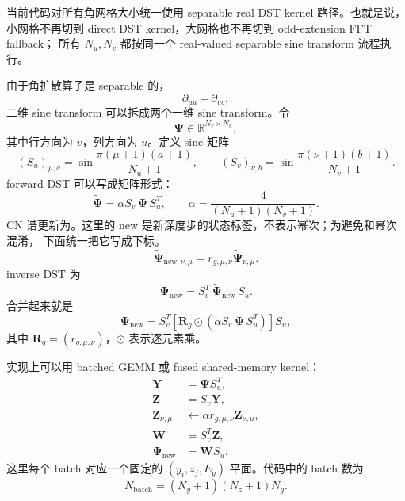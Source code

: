 \documentclass[11pt,a4paper]{ctexart}
\begin{document}
当前代码对所有角网格大小统一使用 separable real DST kernel 路径。也就是说，
小网格不再切到 direct DST kernel，大网格也不再切到 odd-extension FFT fallback；
所有 \(N_u,N_v\) 都按同一个 real-valued separable sine transform 流程执行。

由于角扩散算子是 separable 的，
\begin{equation}
  \partial_{uu}+\partial_{vv},
\end{equation}
二维 sine transform 可以拆成两个一维 sine transform。令
\begin{equation}
  \mathbf \Psi\in\mathbb R^{N_v\times N_u},
\end{equation}
其中行方向为 \(v\)，列方向为 \(u\)。定义 sine 矩阵
\begin{equation}
  (S_u)_{\mu,a}
  =
  \sin\frac{\pi(\mu+1)(a+1)}{N_u+1},
  \qquad
  (S_v)_{\nu,b}
  =
  \sin\frac{\pi(\nu+1)(b+1)}{N_v+1}.
\end{equation}
forward DST 可以写成矩阵形式：
\begin{equation}
  \widetilde{\mathbf \Psi}
  =
  \alpha
  S_v\,\mathbf \Psi\,S_u^T,
  \qquad
  \alpha=\frac{4}{(N_u+1)(N_v+1)}.
\end{equation}
CN 谱更新为。这里的 \(\mathrm{new}\) 是新深度步的状态标签，不表示幂次；为避免和幂次混淆，
下面统一把它写成下标。
\begin{equation}
  \widetilde{\mathbf \Psi}_{\mathrm{new},\nu,\mu}
  =
  r_{g,\mu,\nu}
  \widetilde{\mathbf \Psi}_{\nu,\mu}.
\end{equation}
inverse DST 为
\begin{equation}
  \mathbf \Psi_{\mathrm{new}}
  =
  S_v^T\,\widetilde{\mathbf \Psi}_{\mathrm{new}}\,S_u.
\end{equation}
合并起来就是
\begin{equation}
  \boxed{
  \mathbf \Psi_{\mathrm{new}}
  =
  S_v^T
  \left[
    \mathbf R_g
    \odot
    \left(
      \alpha S_v\,\mathbf \Psi\,S_u^T
    \right)
  \right]
  S_u
  },
\end{equation}
其中 \(\mathbf R_g=(r_{g,\mu,\nu})\)，\(\odot\) 表示逐元素乘。

实现上可以用 batched GEMM 或 fused shared-memory kernel：
\begin{equation}
\begin{aligned}
  \mathbf Y &= \mathbf \Psi S_u^T,\\
  \mathbf Z &= S_v \mathbf Y,\\
  \mathbf Z_{\nu,\mu} &\leftarrow \alpha r_{g,\mu,\nu}\mathbf Z_{\nu,\mu},\\
  \mathbf W &= S_v^T\mathbf Z,\\
  \mathbf \Psi_{\mathrm{new}} &= \mathbf W S_u.
\end{aligned}
\end{equation}
这里每个 batch 对应一个固定的 \((y_i,z_j,E_g)\) 平面。代码中的 batch 数为
\begin{equation}
  N_{\mathrm{batch}}
  =
  (N_y+1)(N_z+1)N_g.
\end{equation}
\end{document}

